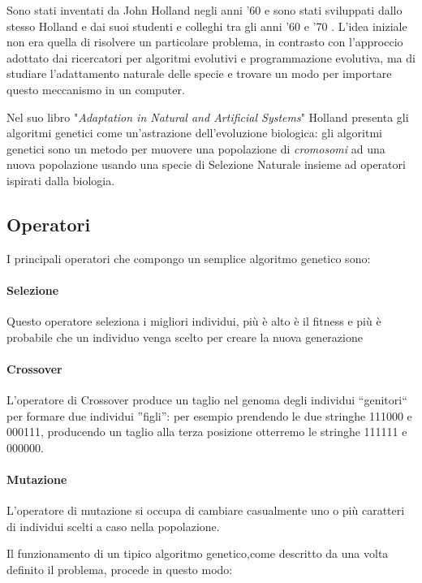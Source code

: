 \documentclass[12pt,a4paper]{report}
\begin{document}
Sono stati inventati da John Holland negli anni '60 e sono stati sviluppati dallo stesso Holland e dai suoi studenti e colleghi tra gli anni '60 e '70 \cite{genetic-algorithm-mitchell}.
L'idea iniziale non era quella di risolvere un particolare problema, in contrasto con l'approccio adottato dai ricercatori per algoritmi evolutivi e programmazione evolutiva, ma di studiare l'adattamento naturale delle specie e trovare un modo per importare questo meccanismo in un computer.

Nel suo libro "\textit{Adaptation in Natural and Artificial Systems}" Holland presenta gli algoritmi genetici come un'astrazione dell'evoluzione biologica: gli algoritmi genetici sono un metodo per muovere una popolazione di \textit{cromosomi} ad una nuova popolazione usando una specie di Selezione Naturale insieme ad operatori ispirati dalla biologia.
         
\subsection{Operatori}

I principali operatori che compongo un semplice algoritmo genetico sono\cite{genetic-algorithm-mitchell}:

\paragraph{Selezione} Questo operatore seleziona i migliori individui, più è alto è il fitness e più è probabile che un individuo venga scelto per creare la nuova generazione

\paragraph{Crossover} L'operatore di Crossover produce un taglio nel genoma degli individui ``genitori`` per formare due individui ''figli'': per esempio prendendo le due stringhe 111000 e 000111, producendo un taglio alla terza posizione otterremo le stringhe  111111 e 000000.

\paragraph{Mutazione} L'operatore di mutazione si occupa di cambiare casualmente uno o più caratteri di individui scelti a caso nella popolazione.

Il funzionamento di un tipico algoritmo genetico,come descritto da \cite{genetic-algorithm-mitchell} una volta definito il problema,  procede in questo modo:
\end{document}
